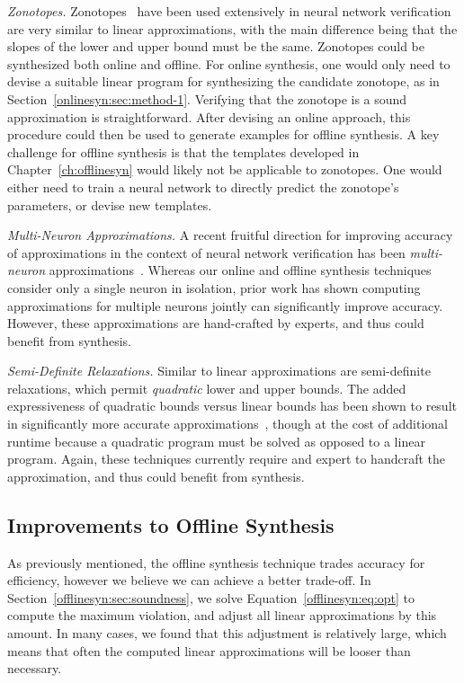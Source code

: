 \textit{Zonotopes.} Zonotopes~\cite{ziegler2012lectures} have been used
extensively in neural network
verification~\cite{singh2018fast,bonaert2021fast,muller2021effective} are
very similar to linear approximations, with the main difference being that
the slopes of
the lower and upper bound must be the same. Zonotopes could be synthesized
both online and offline. For online synthesis, one would only need to
devise a suitable linear program for synthesizing the candidate zonotope,
as in Section~\ref{onlinesyn:sec:method-1}. Verifying that the zonotope is
a sound approximation is straightforward. After devising an online
approach, this procedure could then be used to generate examples for
offline synthesis. A key challenge for offline synthesis is that the
templates developed in Chapter~\ref{ch:offlinesyn} would likely not be
applicable to zonotopes. One would either need to train a neural network to
directly predict the zonotope's parameters, or devise new templates.

\textit{Multi-Neuron Approximations.} A recent fruitful direction for
improving accuracy of approximations in the context of neural network
verification has been \textit{multi-neuron}
approximations~\cite{Singh2019krelu,muller2021prima}. Whereas our online
and offline synthesis techniques consider only a single neuron in
isolation, prior work has shown computing approximations for multiple
neurons jointly can significantly improve accuracy. However, these
approximations are hand-crafted by experts, and thus could benefit from
synthesis.

\textit{Semi-Definite Relaxations.} Similar to linear approximations are
semi-definite relaxations, which permit \textit{quadratic} lower and upper
bounds. The added expressiveness of quadratic bounds versus linear bounds
has been shown to result in significantly more accurate
approximations~\cite{dathathri2020enabling}, though at the cost of
additional runtime because a quadratic program must be solved as opposed to
a linear program. Again, these techniques currently require and expert to
handcraft the approximation, and thus could benefit from synthesis.


\subsection{Improvements to Offline Synthesis}
As previously mentioned, the offline synthesis technique trades accuracy
for efficiency, however we believe we can achieve a better trade-off. In
Section~\ref{offlinesyn:sec:soundness}, we solve
Equation~\ref{offlinesyn:eq:opt} to compute the maximum violation, and
adjust all linear approximations by this amount. In many cases, we found
that this adjustment is relatively large, which means that often the
computed linear approximations will be looser than necessary.

